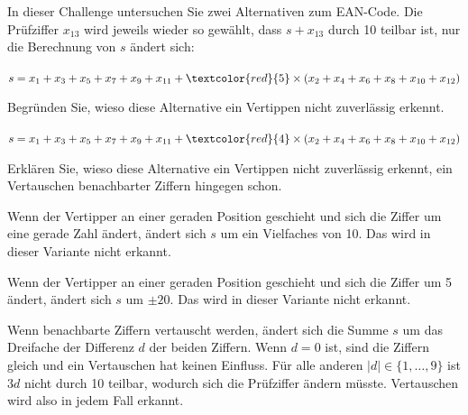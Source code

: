 \begin{mychallenge}
    In dieser Challenge untersuchen Sie zwei Alternativen zum \gls{EAN}-Code. Die Prüfziffer $x_{13}$ wird jeweils wieder so gewählt, dass $s+x_{13}$ durch 10 teilbar ist, nur die Berechnung von $s$ ändert sich:
    \begin{aenum}
        \item $s=x_1+x_3+ x_5+ x_7+ x_9+ x_{11}+\textcolor{red}{5}\times( x_2+ x_4+ x_6+ x_8+ x_{10}+ x_{12})$

              Begründen Sie, wieso diese Alternative ein Vertippen nicht zuverlässig erkennt.
        \item $s=x_1+x_3+ x_5+ x_7+ x_9+ x_{11}+\textcolor{red}{4}\times( x_2+ x_4+ x_6+ x_8+ x_{10}+ x_{12})$

              Erklären Sie, wieso diese Alternative ein Vertippen nicht zuverlässig erkennt, ein Vertauschen benachbarter Ziffern hingegen schon.
    \end{aenum}
    \begin{myanswer}
        \begin{aenum}
            \item Wenn der Vertipper an einer geraden Position geschieht und sich die Ziffer um eine gerade Zahl ändert, ändert sich $s$ um ein Vielfaches von 10. Das wird in dieser Variante nicht erkannt.
            \item Wenn der Vertipper an einer geraden Position geschieht und sich die Ziffer um 5 ändert, ändert sich $s$ um $\pm 20$. Das wird in dieser Variante nicht erkannt.

                  Wenn benachbarte Ziffern vertauscht werden, ändert sich die Summe $s$ um das Dreifache der Differenz $d$ der beiden Ziffern. Wenn $d=0$ ist, sind die Ziffern gleich und ein Vertauschen hat keinen Einfluss. Für alle anderen $|d|\in\{1, \dots, 9\}$ ist $3d$ nicht durch 10 teilbar, wodurch sich die Prüfziffer ändern müsste. Vertauschen wird also in jedem Fall erkannt.
        \end{aenum}
    \end{myanswer}
\end{mychallenge}

